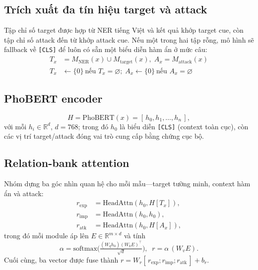 \documentclass[11pt]{article}
\begin{document}
\subsection{Trích xuất đa tín hiệu target và attack}
Tập chỉ số target được hợp từ NER tiếng Việt và kết quả khớp target cue, còn tập chỉ số attack đến từ khớp attack cue. Nếu một trong hai tập rỗng, mô hình sẽ fallback về \texttt{[CLS]} để luôn có sẵn một biểu diễn hàm ẩn ở mức câu:
\begin{align}
  T_x &= M_{\mathrm{NER}}(x)\cup M_{\mathrm{target}}(x), \; A_x = M_{\mathrm{attack}}(x) \\
  T_x &\leftarrow \{0\}\ \text{nếu } T_x=\varnothing; \; A_x \leftarrow \{0\}\ \text{nếu } A_x=\varnothing \nonumber
\end{align}

\subsection{PhoBERT encoder}
\begin{equation}
  H = \mathrm{PhoBERT}(x) = [\,h_0, h_1, \dots, h_n\,],
\end{equation}
với mỗi $h_i \in \mathbb{R}^{d}$, $d=768$; trong đó $h_0$ là biểu diễn \texttt{[CLS]} (context toàn cục), còn các vị trí target/attack đóng vai trò cung cấp bằng chứng cục bộ.

\subsection{Relation-bank attention}
Nhóm dựng ba góc nhìn quan hệ cho mỗi mẫu---target tường minh, context hàm ẩn và attack:
\begin{align}
  r_{\mathrm{exp}} &= \mathrm{HeadAttn}(h_0, H[T_x]), \nonumber\\
  r_{\mathrm{imp}} &= \mathrm{HeadAttn}(h_0, h_0), \\
  r_{\mathrm{atk}} &= \mathrm{HeadAttn}(h_0, H[A_x]), \nonumber
\end{align}
trong đó mỗi module áp lên $E \in \mathbb{R}^{m\times d}$ và tính
\begin{equation}
  \alpha = \mathrm{softmax}\!\Big(\tfrac{(W_q h_0)(W_k E)^\top}{\sqrt d}\Big),\;\; r = \alpha\,(W_v E).
\end{equation}
Cuối cùng, ba vector được fuse thành $r = W_r[\,r_{\mathrm{exp}};r_{\mathrm{imp}};r_{\mathrm{atk}}\,] + b_r$.
\end{document}
